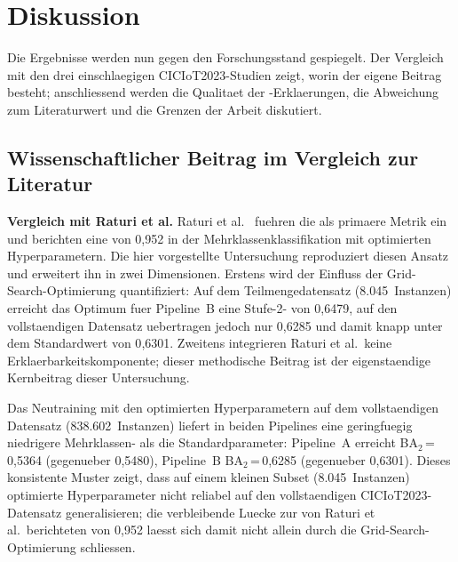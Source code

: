\section{Diskussion}\label{diskussion}

Die Ergebnisse werden nun gegen den Forschungsstand gespiegelt.
Der Vergleich mit den drei einschlaegigen CICIoT2023-Studien zeigt, worin der eigene Beitrag
besteht; anschliessend werden die Qualitaet der \shap{}-Erklaerungen, die Abweichung zum
Literaturwert und die Grenzen der Arbeit diskutiert.

\subsection{Wissenschaftlicher Beitrag im Vergleich zur Literatur}

\textbf{Vergleich mit Raturi et al.}
Raturi et al.\ \cite{raturi2026exploratory} fuehren die \ba{} als primaere Metrik ein und
berichten eine \ba{} von 0{,}952 in der Mehrklassenklassifikation mit optimierten
Hyperparametern.
Die hier vorgestellte Untersuchung reproduziert diesen Ansatz und erweitert ihn in zwei
Dimensionen.
Erstens wird der Einfluss der Grid-Search-Optimierung quantifiziert: Auf dem
Teilmengedatensatz (8.045~Instanzen) erreicht das Optimum fuer Pipeline~B eine
Stufe-2-\ba{} von 0{,}6479, auf den vollstaendigen Datensatz uebertragen jedoch nur 0{,}6285
und damit knapp unter dem Standardwert von 0{,}6301.
Zweitens integrieren Raturi et al.\ keine Erklaerbarkeitskomponente; dieser methodische
Beitrag ist der eigenstaendige Kernbeitrag dieser Untersuchung.

Das Neutraining mit den optimierten Hyperparametern auf dem vollstaendigen Datensatz
(838.602~Instanzen) liefert in beiden Pipelines eine geringfuegig niedrigere
Mehrklassen-\ba{} als die Standardparameter: Pipeline~A erreicht BA$_2$\,=\,0{,}5364
(gegenueber 0{,}5480), Pipeline~B BA$_2$\,=\,0{,}6285 (gegenueber 0{,}6301).
Dieses konsistente Muster zeigt, dass auf einem kleinen Subset (8.045~Instanzen) optimierte
Hyperparameter nicht reliabel auf den vollstaendigen CICIoT2023-Datensatz generalisieren;
die verbleibende Luecke zur von Raturi et al.\ berichteten \ba{} von 0{,}952 laesst sich damit
nicht allein durch die Grid-Search-Optimierung schliessen.

